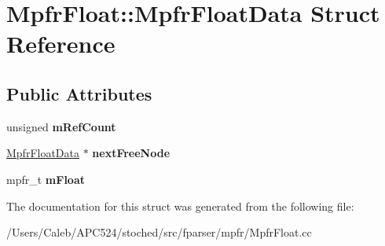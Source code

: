 \hypertarget{struct_mpfr_float_1_1_mpfr_float_data}{}\section{Mpfr\+Float\+:\+:Mpfr\+Float\+Data Struct Reference}
\label{struct_mpfr_float_1_1_mpfr_float_data}
\subsection*{Public Attributes}
\begin{DoxyCompactItemize}
\item 
\mbox{\label{struct_mpfr_float_1_1_mpfr_float_data_a65c006a9ee36ef49acf88b70a83fc166}} 
unsigned {\bfseries m\+Ref\+Count}
\item 
\mbox{\label{struct_mpfr_float_1_1_mpfr_float_data_afde34bf71430517d44fb89833237fca7}} 
\hyperlink{struct_mpfr_float_1_1_mpfr_float_data}{Mpfr\+Float\+Data} $\ast$ {\bfseries next\+Free\+Node}
\item 
\mbox{\label{struct_mpfr_float_1_1_mpfr_float_data_a2f7984309c7bc712a259c9e2bbdc88f6}} 
mpfr\+\_\+t {\bfseries m\+Float}
\end{DoxyCompactItemize}


The documentation for this struct was generated from the following file\+:\begin{DoxyCompactItemize}
\item 
/\+Users/\+Caleb/\+A\+P\+C524/stoched/src/fparser/mpfr/Mpfr\+Float.\+cc\end{DoxyCompactItemize}
